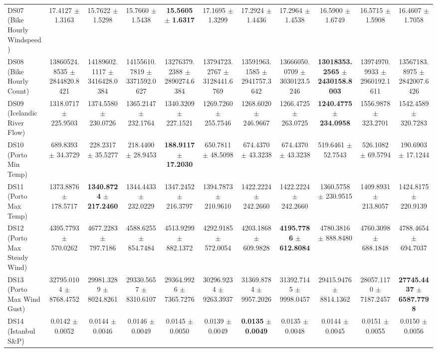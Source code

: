 \begin{table}[t]
{{\begin{tabular}{lcccccccccc}
DS07 (Bike Hourly Windspeed) & 17.4127 $\pm$ 1.3163 & 15.7622 $\pm$ 1.5298 & 15.7660 $\pm$ 1.5438 & \textbf{15.5605} $\pm$ \textbf{1.6317} & 17.1695 $\pm$ 1.3299 & 17.2924 $\pm$ 1.4436 & 17.2964 $\pm$ 1.4538 & 16.5900 $\pm$ 1.6749 & 16.5715 $\pm$ 1.5908 & 16.4607 $\pm$ 1.7058 \\
DS08 (Bike Hourly Count) & 13860524.8535 $\pm$ 2844820.8421 & 14189602.1117 $\pm$ 3416428.0384 & 14155610.7819 $\pm$ 3371592.0627 & 13276379.2388 $\pm$ 2890274.6384 & 13794723.2767 $\pm$ 3128441.6769 & 13591963.1585 $\pm$ 2941757.3642 & 13666050.0709 $\pm$ 3030123.5246 & \textbf{13018353.2565} $\pm$ \textbf{2430158.8003} & 13974970.9933 $\pm$ 2960192.1611 & 13567183.8975 $\pm$ 2842007.6426 \\
DS09 (Icelandic River Flow) & 1318.0717 $\pm$ 225.9503 & 1374.5580 $\pm$ 230.0726 & 1365.2147 $\pm$ 232.1764 & 1340.3209 $\pm$ 227.1521 & 1269.7260 $\pm$ 255.7546 & 1268.6020 $\pm$ 246.9667 & 1266.4725 $\pm$ 263.0725 & \textbf{1240.4775} $\pm$ \textbf{234.0958} & 1556.9878 $\pm$ 323.2701 & 1542.4589 $\pm$ 320.7283 \\
DS10 (Porto Min Temp) & 689.8393 $\pm$ 34.3729 & 228.2317 $\pm$ 35.5277 & 218.4400 $\pm$ 28.9453 & \textbf{188.9117} $\pm$ \textbf{17.2030} & 650.7811 $\pm$ 48.5098 & 674.4370 $\pm$ 43.3238 & 674.4370 $\pm$ 43.3238 & 519.6461 $\pm$ 52.7543 & 526.1082 $\pm$ 69.5794 & 190.6903 $\pm$ 17.1244 \\
DS11 (Porto Max Temp) & 1373.8876 $\pm$ 178.5717 & \textbf{1340.8724} $\pm$ \textbf{217.2460} & 1344.4433 $\pm$ 232.0229 & 1347.2452 $\pm$ 216.3797 & 1394.7873 $\pm$ 210.9610 & 1422.2224 $\pm$ 242.2660 & 1422.2224 $\pm$ 242.2660 & 1360.5758 $\pm$ 230.9515 & 1409.8931 $\pm$ 213.8057 & 1424.8175 $\pm$ 220.9139 \\
DS12 (Porto Max Steady Wind) & 4395.7793 $\pm$ 570.0262 & 4677.2283 $\pm$ 797.7186 & 4588.6255 $\pm$ 854.7484 & 4513.9299 $\pm$ 882.1372 & 4292.9185 $\pm$ 572.0054 & 4203.1868 $\pm$ 609.9828 & \textbf{4195.7786} $\pm$ \textbf{612.8084} & 4780.3816 $\pm$ 888.8480 & 4760.3098 $\pm$ 688.1848 & 4788.4654 $\pm$ 694.7037 \\
DS13 (Porto Max Wind Gust) & 32795.0104 $\pm$ 8768.4752 & 29981.3289 $\pm$ 8024.8261 & 29330.5657 $\pm$ 8310.6107 & 29364.9926 $\pm$ 7365.7276 & 30296.9234 $\pm$ 9263.3937 & 31369.8784 $\pm$ 9957.2026 & 31392.7145 $\pm$ 9998.0457 & 29415.9476 $\pm$ 8814.1362 & 28057.1170 $\pm$ 7187.2457 & \textbf{27745.4437} $\pm$ \textbf{6587.7798} \\
DS14 (Istanbul S\&P) & 0.0142 $\pm$ 0.0052 & 0.0144 $\pm$ 0.0046 & 0.0146 $\pm$ 0.0049 & 0.0145 $\pm$ 0.0050 & 0.0139 $\pm$ 0.0049 & \textbf{0.0135} $\pm$ \textbf{0.0049} & 0.0135 $\pm$ 0.0048 & 0.0144 $\pm$ 0.0045 & 0.0151 $\pm$ 0.0055 & 0.0150 $\pm$ 0.0056 \\

\end{tabular}}}
\end{table}
